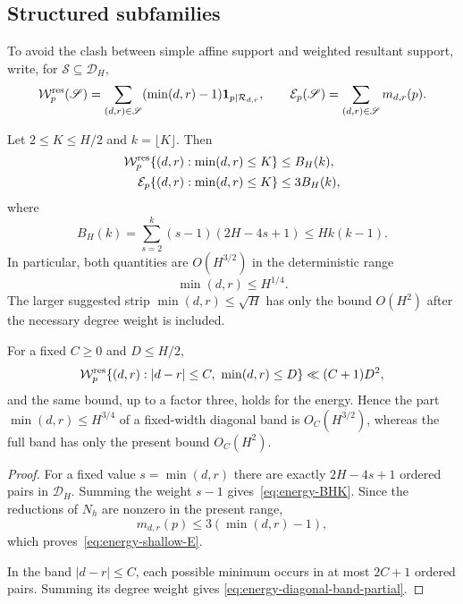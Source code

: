 \subsection{Structured subfamilies}

To avoid the clash between simple affine support and weighted resultant
support, write, for $\mathscr S\subseteq\mathscr D_H$,
\[
 \mathcal W_p^{\rm res}(\mathscr S)
 =\sum_{(d,r)\in\mathscr S}
  (\min(d,r)-1)\mathbf1_{p\mid\mathcal R_{d,r}},
 \qquad
 \mathcal E_p(\mathscr S)
 =\sum_{(d,r)\in\mathscr S}m_{d,r}(p).
\]

\begin{proposition}
\label{prop:energy-structured-combinatorial}
Let $2\leq K\leq H/2$ and $k=\lfloor K\rfloor$.  Then
\begin{align}
 \mathcal W_p^{\rm res}
 \{(d,r):\min(d,r)\leq K\}
 &\leq B_H(k),\label{eq:energy-shallow-W}\\
 \mathcal E_p
 \{(d,r):\min(d,r)\leq K\}
 &\leq3B_H(k),\label{eq:energy-shallow-E}
\end{align}
where
\begin{equation}\label{eq:energy-BHK}
 B_H(k)=\sum_{s=2}^k(s-1)(2H-4s+1)
 \leq Hk(k-1).
\end{equation}
In particular, both quantities are $O(H^{3/2})$ in the deterministic
range
\[
 \min(d,r)\leq H^{1/4}.
\]
The larger suggested strip $\min(d,r)\leq\sqrt H$ has only the bound
$O(H^2)$ after the necessary degree weight is included.

For a fixed $C\geq0$ and $D\leq H/2$,
\begin{equation}\label{eq:energy-diagonal-band-partial}
 \mathcal W_p^{\rm res}
 \{(d,r):|d-r|\leq C,\ \min(d,r)\leq D\}
 \ll(C+1)D^2,
\end{equation}
and the same bound, up to a factor three, holds for the energy.  Hence
the part $\min(d,r)\leq H^{3/4}$ of a fixed-width diagonal band is
$O_C(H^{3/2})$, whereas the full band has only the present bound
$O_C(H^2)$.
\end{proposition}

\begin{proof}
For a fixed value $s=\min(d,r)$ there are exactly
$2H-4s+1$ ordered pairs in $\mathscr D_H$.  Summing the weight $s-1$
gives~\eqref{eq:energy-BHK}.  Since the reductions of $N_h$ are nonzero
in the present range,
\[
 m_{d,r}(p)\leq3(\min(d,r)-1),
\]
which proves~\eqref{eq:energy-shallow-E}.

In the band $|d-r|\leq C$, each possible minimum occurs in at most
$2C+1$ ordered pairs.  Summing its degree weight gives
\eqref{eq:energy-diagonal-band-partial}.
\end{proof}

